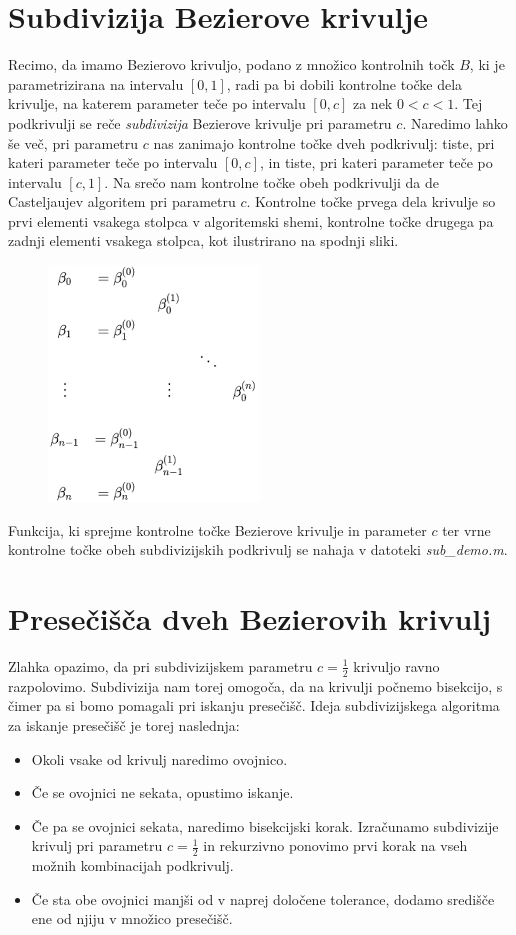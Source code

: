 \documentclass[a4paper, 12pt]{article} %
\begin{document}
\section{Subdivizija Bezierove krivulje}

Recimo, da imamo Bezierovo krivuljo, podano z množico kontrolnih točk $B$, ki je parametrizirana na intervalu $[0, 1]$, radi pa bi dobili kontrolne točke dela krivulje, na katerem parameter teče po intervalu $[0, c]$ za nek $0 < c < 1$. Tej podkrivulji se reče \emph{subdivizija} Bezierove krivulje pri parametru $c$. Naredimo lahko še več, pri parametru $c$ nas zanimajo kontrolne točke dveh podkrivulj: tiste, pri kateri parameter teče po intervalu $[0, c]$, in tiste, pri kateri parameter teče po intervalu $[c, 1]$. Na srečo nam kontrolne točke obeh podkrivulji da de Casteljaujev algoritem pri parametru $c$. Kontrolne točke prvega dela krivulje so prvi elementi vsakega stolpca v algoritemski shemi, kontrolne točke drugega pa zadnji elementi vsakega stolpca, kot ilustrirano na spodnji sliki.

\begin{figure}[h]
\centering
\includegraphics[scale=0.5]{deCasteljau}
\end{figure}

Funkcija, ki sprejme kontrolne točke Bezierove krivulje in parameter $c$ ter vrne kontrolne točke obeh subdivizijskih podkrivulj se nahaja v datoteki \emph{sub\_demo.m}.


\section{Presečišča dveh Bezierovih krivulj}

Zlahka opazimo, da pri subdivizijskem parametru $c = \frac{1}{2}$ krivuljo ravno razpolovimo. Subdivizija nam torej omogoča, da na krivulji počnemo bisekcijo, s čimer pa si bomo pomagali pri iskanju presečišč. Ideja subdivizijskega algoritma za iskanje presečišč je torej naslednja:
\begin{itemize}
\item Okoli vsake od krivulj naredimo ovojnico.
\item Če se ovojnici ne sekata, opustimo iskanje.
\item Če pa se ovojnici sekata, naredimo bisekcijski korak. Izračunamo subdivizije krivulj pri parametru $c = \frac{1}{2}$ in rekurzivno ponovimo prvi korak na vseh možnih kombinacijah podkrivulj.
\item Če sta obe ovojnici manjši od v naprej določene tolerance, dodamo središče ene od njiju v množico presečišč.
\end{itemize}
\end{document}
